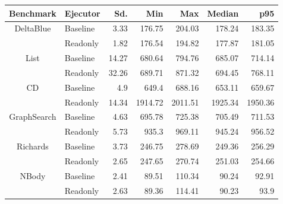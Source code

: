 \begin{center}
\begin{tabular}{ c | l r r r r r}
\toprule
\textbf{Benchmark} & \textbf{Ejecutor} & \textbf{Sd.} & \textbf{Min} & \textbf{Max} & \textbf{Median} & \textbf{p95}\\
\toprule

\multirow{2}{*}{ DeltaBlue } & Baseline & 3.33 & 176.75 & 204.03 & 178.24 & 183.35 \\
& Readonly & 1.82 & 176.54 & 194.82 & 177.87 & 181.05 \\
\midrule

\multirow{2}{*}{ List } & Baseline & 14.27 & 680.64 & 794.76 & 685.07 & 714.14 \\
& Readonly & 32.26 & 689.71 & 871.32 & 694.45 & 768.11 \\
\midrule

\multirow{2}{*}{ CD } & Baseline & 4.9 & 649.4 & 688.16 & 653.11 & 659.67 \\
& Readonly & 14.34 & 1914.72 & 2011.51 & 1925.34 & 1950.36 \\
\midrule

\multirow{2}{*}{ GraphSearch } & Baseline & 4.63 & 695.78 & 725.38 & 705.49 & 711.53 \\
& Readonly & 5.73 & 935.3 & 969.11 & 945.24 & 956.52 \\
\midrule

\multirow{2}{*}{ Richards } & Baseline & 3.73 & 246.75 & 278.69 & 249.36 & 256.29 \\
& Readonly & 2.65 & 247.65 & 270.74 & 251.03 & 254.66 \\
\midrule

\multirow{2}{*}{ NBody } & Baseline & 2.41 & 89.51 & 110.34 & 90.24 & 92.91 \\
& Readonly & 2.63 & 89.36 & 114.41 & 90.23 & 93.9 \\
\midrule

\end{tabular}
\end{center}